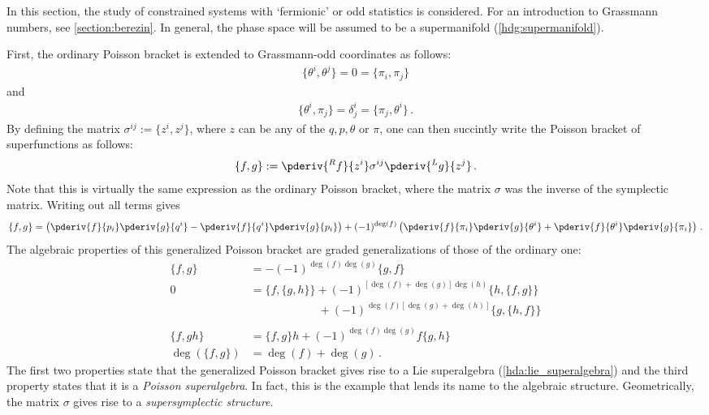     In this section, the study of constrained systems with `fermionic' or odd statistics is considered. For an introduction to Grassmann numbers, see \cref{section:berezin}. In general, the phase space will be assumed to be a supermanifold (\cref{hdg:supermanifold}).

    First, the ordinary Poisson bracket is extended to Grassmann-odd coordinates as follows:
    \begin{gather}
        \{\theta^i,\theta^j\} = 0 = \{\pi_i,\pi_j\}
    \end{gather}
    and
    \begin{gather}
        \{\theta^i,\pi_j\} = \delta^i_j = \{\pi_j,\theta^i\}\,.
    \end{gather}
    By defining the matrix $\sigma^{ij} := \{z^i,z^j\}$, where $z$ can be any of the $q,p,\theta$ or $\pi$, one can then succintly write the Poisson bracket of superfunctions as follows:
    \begin{gather}
        \{f,g\} := \pderiv{^Rf}{z^i}\sigma^{ij}\pderiv{^Lg}{z^j}\,.
    \end{gather}
    Note that this is virtually the same expression as the ordinary Poisson bracket, where the matrix $\sigma$ was the inverse of the symplectic matrix. Writing out all terms gives
    \begin{gather}
        \{f,g\} = \left(\pderiv{f}{p_i}\pderiv{g}{q^i}-\pderiv{f}{q^i}\pderiv{g}{p_i}\right) + (-1)^{\deg(f)}\left(\pderiv{f}{\pi_i}\pderiv{g}{\theta^i} + \pderiv{f}{\theta^i}\pderiv{g}{\pi_i}\right)\,.
    \end{gather}
    The algebraic properties of this generalized Poisson bracket are graded generalizations of those of the ordinary one:
    \begin{align}
        \{f,g\} &= -(-1)^{\deg(f)\deg(g)}\{g,f\}\\
        0 &= \{f,\{g,h\}\} + (-1)^{[\deg(f)+\deg(g)]\deg(h)}\{h,\{f,g\}\}\nonumber\\
        &\ \phantom{= \{f,\{g,h\}\} } + (-1)^{\deg(f)[\deg(g)+\deg(h)]}\{g,\{h,f\}\}\\\nonumber\\
        \{f,gh\} &= \{f,g\}h + (-1)^{\deg(f)\deg(g)}f\{g,h\}\\
        \deg(\{f,g\}) &= \deg(f)+\deg(g)\,.
    \end{align}
    The first two properties state that the generalized Poisson bracket gives rise to a Lie superalgebra (\cref{hda:lie_superalgebra}) and the third property states that it is a \textit{Poisson superalgebra}. In fact, this is the example that lends its name to the algebraic structure. Geometrically, the matrix $\sigma$ gives rise to a \textit{supersymplectic structure}.

